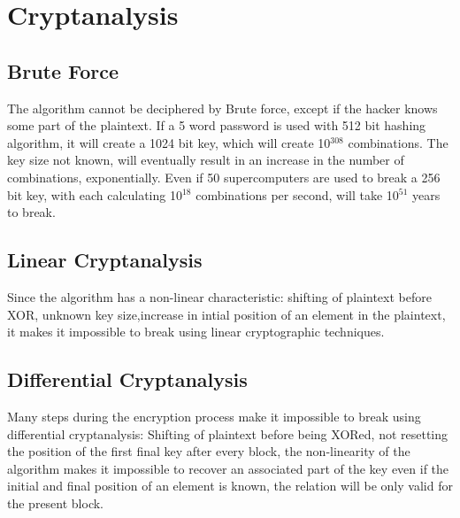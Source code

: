 \documentclass[letterpaper, 12 pt, conference]{ieeeconf}  %
\begin{document}
\section{Cryptanalysis}
\subsection{Brute Force}
The algorithm cannot be deciphered by Brute force, except if the hacker knows some part of the plaintext. If a 5 word password is used with 512 bit hashing algorithm, it will create a 1024 bit key, which will create 10$^{308}$ combinations.
The key size not known, will eventually result in an increase in the number of combinations, exponentially. Even if 50 supercomputers are used to break a 256 bit key, with each calculating 10$^{18}$ combinations per second, will take 10$^{51}$ years to break.
\subsection{Linear Cryptanalysis} 
Since the algorithm has a non-linear characteristic: shifting of plaintext before XOR, unknown key size,increase in intial position of an element in the plaintext, it makes it impossible to break using linear cryptographic techniques.
\subsection{Differential Cryptanalysis} 
Many steps during the encryption process make it impossible to break using differential cryptanalysis: Shifting of plaintext before being XORed, not resetting the position of the first final key after every block, the non-linearity of the algorithm makes it impossible to recover an associated part of the key even if the initial and final position of an element is known, the relation will be only valid for the present block.
\end{document}
